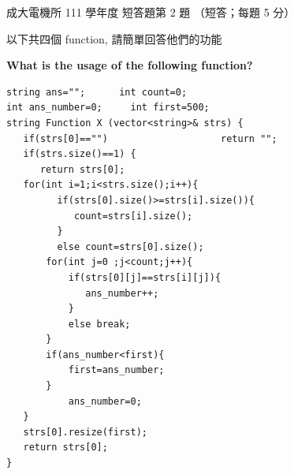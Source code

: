 \begin{pastexam}[label={px:ncku-111-ee-ds-22}]{成大電機所 111 學年度 短答題第 2 題}
（短答；每題 5 分）

以下共四個 function, 請簡單回答他們的功能

\textbf{What is the usage of the following function?}
\begin{verbatim}
string ans="";      int count=0;
int ans_number=0;     int first=500;
string Function X (vector<string>& strs) {
   if(strs[0]=="")                    return "";
   if(strs.size()==1) {
      return strs[0];
   for(int i=1;i<strs.size();i++){
         if(strs[0].size()>=strs[i].size()){
            count=strs[i].size();
         }
         else count=strs[0].size();
       for(int j=0 ;j<count;j++){
           if(strs[0][j]==strs[i][j]){
              ans_number++;
           }
           else break;
       }
       if(ans_number<first){
           first=ans_number;
       }
           ans_number=0;
   }
   strs[0].resize(first);
   return strs[0];
}
\end{verbatim}
\end{pastexam}

